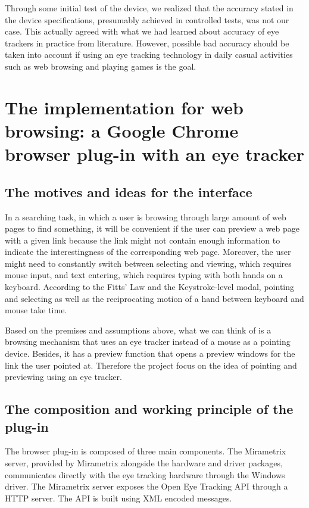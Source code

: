 \documentclass[english]{tktltiki}
\begin{document}
Through some initial test of the device, we realized that the accuracy stated in the device specifications, presumably achieved in controlled tests, was not our case. This actually agreed with what we had learned about accuracy of eye trackers in practice from literature. \cite{majaranta14} However, possible bad accuracy should be taken into account if using an eye tracking technology in daily casual activities such as web browsing and playing games is the goal. 


\section{The implementation for web browsing: a Google Chrome browser plug-in with an eye tracker}


\subsection{The motives and ideas for the interface}  

In a searching task, in which a user is browsing through large amount of web pages to find something, it will be convenient if the user can preview a web page with a given link because the link might not contain enough information to indicate the interestingness of the corresponding web page. Moreover, the user might need to constantly switch between selecting and viewing, which requires mouse input, and text entering, which requires typing with both hands on a keyboard. According to the Fitts' Law and the Keystroke-level modal,\cite{Fitts64}\cite{Card:1980:KMU:358886.358895} pointing and selecting as well as the reciprocating motion of a hand between keyboard and mouse take time. 

Based on the premises and assumptions above, what we can think of is a browsing mechanism that uses an eye tracker instead of a mouse as a pointing device. Besides, it has a preview function that opens a preview windows for the link the user pointed at. Therefore the project focus on the idea of pointing and previewing using an eye tracker.  



\subsection{The composition and working principle of the plug-in}

The browser plug-in is composed of three main components. The Mirametrix server, provided by Mirametrix alongside the hardware and driver packages, communicates directly with the eye tracking hardware through the Windows driver. The Mirametrix server exposes the Open Eye Tracking API through a HTTP server. The API is built using XML encoded messages.
\end{document}
